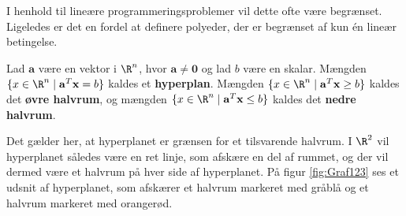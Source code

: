 %
I henhold til lineære programmeringsproblemer vil dette ofte være begrænset.
Ligeledes er det en fordel at definere polyeder, der er begrænset af kun én lineær betingelse. 
%
%
\begin{defn}{}{}
Lad $\mathbf{a}$ være en vektor i $\R^n$, hvor $\mathbf{a} \neq \mathbf{0}$ og lad $b$ være en skalar.
Mængden $\{x \in \R^n \mid \mathbf{a}^T \mathbf{x}=b\}$ kaldes et \textbf{hyperplan}.
%
Mængden $\{x \in \R^n \mid \mathbf{a}^T \mathbf{x} \geq b\}$ kaldes det \textbf{øvre halvrum}, og
mængden $\{x \in \R^n \mid \mathbf{a}^T \mathbf{x} \leq b\}$ kaldes det \textbf{nedre halvrum}.
\end{defn}
\noindent
%
Det gælder her, at hyperplanet er grænsen for et tilsvarende halvrum.
I $\R^2$ vil hyperplanet således være en ret linje, som afskære en del af rummet, og der vil dermed være et halvrum på hver side af hyperplanet.
På figur \ref{fig:Graf123} ses et udsnit af hyperplanet, som afskærer et halvrum markeret med gråblå og et halvrum markeret med orangerød. 

